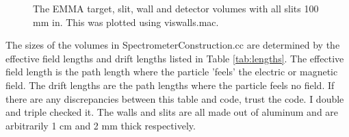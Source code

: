 \documentclass[letter,11pt]{article}
\begin{document}
\begin{figure}
\centering
	\caption{The EMMA target, slit, wall and detector volumes with all slits 100 mm in. This was plotted using viswalls.mac.}
	\label{fig:wallin}
\end{figure}

The sizes of the volumes in SpectrometerConstruction.cc are determined by the effective field lengths and drift lengths listed in Table \ref{tab:lengths}. The effective field length is the path length where the particle 'feels' the electric or magnetic field. The drift lengths are the path lengths where the particle feels no field. If there are any discrepancies between this table and code, trust the code. I double and triple checked it. The walls and slits are all made out of aluminum and are arbitrarily 1 cm and 2 mm thick respectively.
\end{document}

